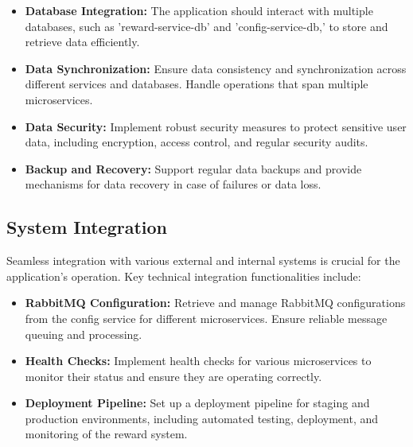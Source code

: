 \begin{itemize}
    \item \textbf{Database Integration:} The application should interact with multiple databases, such as 'reward-service-db' and 'config-service-db,' to store and retrieve data efficiently.
    \item \textbf{Data Synchronization:} Ensure data consistency and synchronization across different services and databases. Handle operations that span multiple microservices.
    \item \textbf{Data Security:} Implement robust security measures to protect sensitive user data, including encryption, access control, and regular security audits.
    \item \textbf{Backup and Recovery:} Support regular data backups and provide mechanisms for data recovery in case of failures or data loss.
\end{itemize}

\subsection{System Integration}
Seamless integration with various external and internal systems is crucial for the application's operation. Key technical integration functionalities include:

\begin{itemize}
    \item \textbf{RabbitMQ Configuration:} Retrieve and manage RabbitMQ configurations from the config service for different microservices. Ensure reliable message queuing and processing.
    \item \textbf{Health Checks:} Implement health checks for various microservices to monitor their status and ensure they are operating correctly.
    \item \textbf{Deployment Pipeline:} Set up a deployment pipeline for staging and production environments, including automated testing, deployment, and monitoring of the reward system.
\end{itemize}


